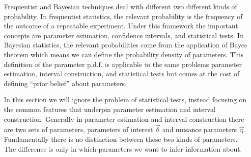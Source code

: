 Frequentist and Bayesian techniques deal with different two different kinds of probability.
In frequentist statistics, the relevant probability is the frequency of the outcome of a repeatable experiment.
Under this framework the important concepts are parameter estimation, confidence intervals, and statistical tests.
In Bayesian statistics, the relevant probabilities come from the application of Bayes theorem which means we can define the probability density of parameters.
This definition of the parameter p.d.f. is applicable to the same problems parameter estimation, interval construction, and statistical tests but comes at the cost of defining ``prior belief'' about parameters.

In this section we will ignore the problem of statistical tests, instead focusing on the common features that underpin parameter estimation and interval construction.
Generally in parameter estimation and interval construction there are two sets of parameters, parameters of interest $\vec\theta$ and nuisance parameters $\vec\eta$.
Fundamentally there is no distinction between these two kinds of parameters.
The difference is only in which parameters we want to infer information about.

